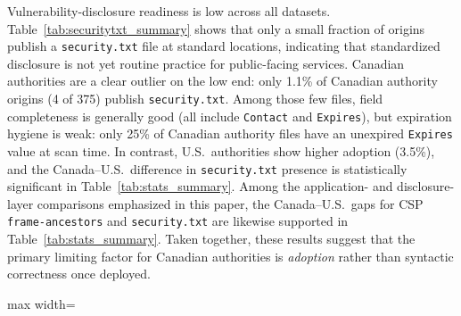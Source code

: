 \documentclass[a4paper,fleqn]{cas-sc}
\begin{document}
    Vulnerability-disclosure readiness is low across all datasets. 
    Table~\ref{tab:securitytxt_summary} shows that only a small fraction of origins publish a \texttt{security.txt} file at standard locations, indicating that standardized disclosure is not yet routine practice for public-facing services. 
    Canadian authorities are a clear outlier on the low end: only 1.1\% of Canadian authority origins (4 of 375) publish \texttt{security.txt}. 
    Among those few files, field completeness is generally good (all include \texttt{Contact} and \texttt{Expires}), but expiration hygiene is weak: only 25\% of Canadian authority files have an unexpired \texttt{Expires} value at scan time. 
    In contrast, U.S.\ authorities show higher adoption (3.5\%), and the Canada--U.S.\ difference in \texttt{security.txt} presence is statistically significant in Table~\ref{tab:stats_summary}. Among the application- and disclosure-layer comparisons emphasized in this paper, the Canada--U.S.\ gaps for CSP \texttt{frame-ancestors} and \texttt{security.txt} are likewise supported in Table~\ref{tab:stats_summary}. Taken together, these results suggest that the primary limiting factor for Canadian authorities is \emph{adoption} rather than syntactic correctness once deployed. 

\begin{table}[t]
  \caption{Security.txt adoption and field completeness by dataset.}
  \label{tab:securitytxt_summary}
  \centering
  \scriptsize
  \setlength{\tabcolsep}{2.2pt} 
  \renewcommand{\arraystretch}{1.15}

  \begin{adjustbox}{max width=\columnwidth}
  \end{adjustbox}
\end{table}
\end{document}
